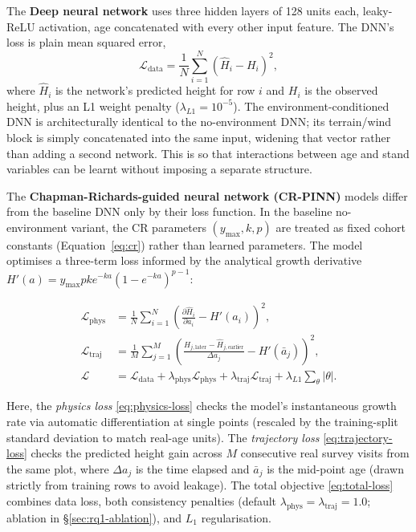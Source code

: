 The \textbf{Deep neural network} uses three hidden layers of 128 units each, leaky-ReLU activation, age concatenated with every other
input feature. The DNN's loss is plain mean squared error,
\begin{equation}
\mathcal{L}_{\text{data}} = \frac{1}{N}\sum_{i=1}^{N}\left(\hat H_i - H_i\right)^2,
\label{eq:data-loss}
\end{equation}
where $\hat H_i$ is the network's predicted height for row $i$ and $H_i$ is the observed height,
plus an L1 weight penalty ($\lambda_{L1}=10^{-5}$). The environment-conditioned DNN is
architecturally identical to the no-environment DNN; its terrain/wind block is simply concatenated
into the same input, widening that vector rather than adding a second network. This is so that interactions between age and stand variables can be learnt without imposing a separate structure. 


The \textbf{Chapman-Richards-guided neural network (CR-PINN)} models differ from the baseline DNN only by their loss function. In the baseline no-environment variant, the CR parameters $(y_{\max}, k, p)$ are treated as fixed cohort constants (Equation~\ref{eq:cr}) rather than learned parameters. The model optimises a three-term loss informed by the analytical growth derivative $H'(a) = y_{\max} p k e^{-ka}(1 - e^{-ka})^{p-1}$:

\begin{subequations}
\label{eq:cr-pinn-losses}
\begin{align}
\mathcal{L}_{\text{phys}} &= \frac{1}{N}\sum_{i=1}^{N}\left(\frac{\partial \hat{H}_i}{\partial a_i} - H'(a_i)\right)^2, \label{eq:physics-loss} \\
\mathcal{L}_{\text{traj}} &= \frac{1}{M}\sum_{j=1}^{M}\left(\frac{\hat{H}_{j,\text{later}} - \hat{H}_{j,\text{earlier}}}{\Delta a_j} - H'(\bar{a}_j)\right)^2, \label{eq:trajectory-loss} \\
\mathcal{L} &= \mathcal{L}_{\text{data}} + \lambda_{\text{phys}}\mathcal{L}_{\text{phys}} + \lambda_{\text{traj}}\mathcal{L}_{\text{traj}} + \lambda_{L1}\sum_{\theta}|\theta|. \label{eq:total-loss}
\end{align}
\end{subequations}

Here, the \emph{physics loss} \eqref{eq:physics-loss} checks the model's instantaneous growth rate via automatic differentiation at single points (rescaled by the training-split standard deviation to match real-age units). The \emph{trajectory loss} \eqref{eq:trajectory-loss} checks the predicted height gain across $M$ consecutive real survey visits from the same plot, where $\Delta a_j$ is the time elapsed and $\bar{a}_j$ is the mid-point age (drawn strictly from training rows to avoid leakage). The total objective \eqref{eq:total-loss} combines data loss, both consistency penalties (default $\lambda_{\text{phys}}=\lambda_{\text{traj}}=1.0$; ablation in \S\ref{sec:rq1-ablation}), and $L_1$ regularisation.

